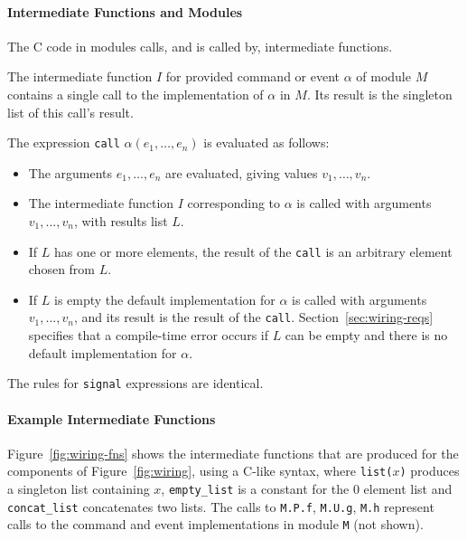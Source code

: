 \documentclass[11pt]{article}
\newcommand{\code}[1]{{\tt #1}}
\begin{document}
\paragraph{Intermediate Functions and Modules}

The C code in modules calls, and is called by, intermediate functions. 

The intermediate function $I$ for provided command or event $\alpha$ of
module $M$ contains a single call to the implementation of $\alpha$ in
$M$. Its result is the singleton list of this call's result.

The expression \code{call} $\alpha(e_1, \ldots, e_n)$ is evaluated as
follows:
\begin{itemize}
\item The arguments $e_1, \ldots, e_n$ are evaluated, giving values $v_1,
\ldots, v_n$.
\item The intermediate function $I$ corresponding to $\alpha$ is called
with arguments $v_1, \ldots, v_n$, with results list $L$.
\item If $L$ has one or more elements, the result of the \code{call} is an
arbitrary element chosen from $L$.
\item If $L$ is empty the default implementation for $\alpha$ is
called with arguments $v_1, \ldots, v_n$, and its result is the result of
the \code{call}. Section~\ref{sec:wiring-reqs} specifies that a
compile-time error occurs if $L$ can be empty and there is no default
implementation for $\alpha$.
\end{itemize}
The rules for \code{signal} expressions are identical.

\paragraph{Example Intermediate Functions} 

Figure~\ref{fig:wiring-fns} shows the intermediate functions that are
produced for the components of Figure~\ref{fig:wiring}, using a C-like
syntax, where \code{list($x$)} produces a singleton list containing $x$,
\code{empty\_list} is a constant for the 0 element list and
\code{concat\_list} concatenates two lists. The calls to \code{M.P.f},
\code{M.U.g}, \code{M.h} represent calls to the command and event
implementations in module \code{M} (not shown).
\end{document}
